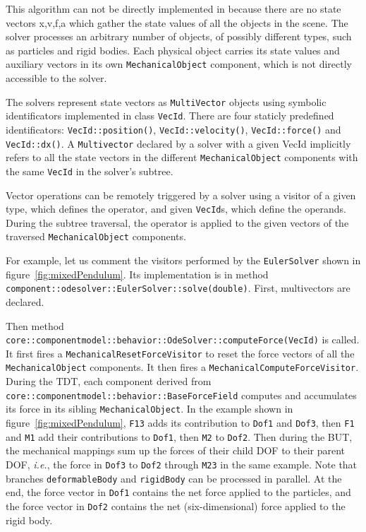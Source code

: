 This algorithm can not be directly implemented in \sofa{} because there are no state vectors x,v,f,a which gather the state values of all the objects in the scene.
The solver processes an arbitrary number of objects, of possibly different types, such as particles and rigid bodies. Each physical object carries its state values and auxiliary vectors in its own \texttt{MechanicalObject} component, which is not directly accessible to the solver.

The solvers represent state vectors as \texttt{MultiVector} objects using symbolic identificators implemented in class \texttt{VecId}.
There are four staticly predefined identificators: \texttt{VecId::position()}, \texttt{VecId::velocity()}, \texttt{VecId::force()} and \texttt{VecId::dx()}.
A \texttt{Multivector} declared by a solver with a given VecId implicitly refers to all the state vectors in the different \texttt{MechanicalObject} components with the same \texttt{VecId} in the solver's subtree.

Vector operations can be remotely triggered by a solver using a visitor of a given type, which defines the operator, and given \texttt{VecId}s, which define the operands.
During the subtree traversal, the operator is applied to the given vectors of the traversed \texttt{MechanicalObject} components.

For example, let us comment the visitors performed by the \texttt{EulerSolver} shown in figure~\ref{fig:mixedPendulum}. Its implementation is in method \texttt{component::odesolver::EulerSolver::solve(double)}.
First, multivectors are declared.

Then method \texttt{core::componentmodel::behavior::OdeSolver::computeForce(VecId)} is called. 
It first fires a \texttt{MechanicalResetForceVisitor} to reset the force vectors of all the \texttt{MechanicalObject} components. 
It then fires a  \texttt{MechanicalComputeForceVisitor}. 
During the TDT, each component derived from \texttt{core::componentmodel::behavior::BaseForceField} computes and accumulates its force in its sibling \texttt{MechanicalObject}. 
In the example shown in figure~\ref{fig:mixedPendulum}, \texttt{F13} adds its contribution to \texttt{Dof1} and \texttt{Dof3}, then \texttt{F1} and \texttt{M1} add their contributions to \texttt{Dof1}, then \texttt{M2} to \texttt{Dof2}. 
Then during the BUT, the mechanical mappings sum up the forces of their child DOF to their parent DOF, \textit{i.e.}, the force in \texttt{Dof3} to \texttt{Dof2} through \texttt{M23} in the same example.
Note that branches \texttt{deformableBody} and \texttt{rigidBody} can be processed in parallel.
At the end, the force vector in \texttt{Dof1} contains the net force applied to the particles, and the force vector in \texttt{Dof2} contains the net (six-dimensional) force applied to the rigid body.

